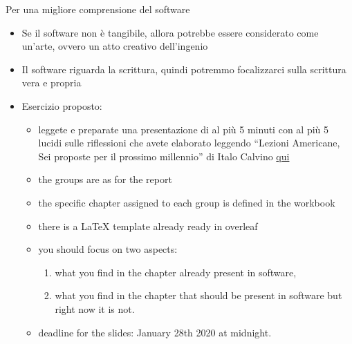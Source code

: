 \documentclass{beamer}
\begin{document}
\begin{frame}{\centerline{Per una migliore comprensione del software}}
\begin{itemize}
\item Se il software non \`{e} tangibile, allora potrebbe essere considerato come un'arte, ovvero un atto creativo dell'ingenio
\item Il software riguarda la scrittura, quindi potremmo focalizzarci sulla scrittura vera e propria 
\item Esercizio proposto: 
\begin{itemize}
\item leggete e preparate una presentazione di al pi\`{u} 5 minuti con al pi\`{u} 5 lucidi sulle riflessioni che avete elaborato leggendo ``Lezioni Americane, Sei proposte per il prossimo millennio'' di Italo Calvino \href{https://github.com/GiancarloSucci/UniBo.IDSEPC.A2022/blob/main/A2022.IDSEPC.ProcessoDiProduzione/ItaloCalvino.LezioniAmericane.pdf}{qui}
\item the groups are as for the report
\item the specific chapter assigned to each group is defined in the workbook
\item there is a LaTeX template already ready in overleaf
\item you should focus on two aspects:
\begin{enumerate}
\item what you find in the chapter already present in software,
\item what you find in the chapter that should be present in software but right now it is not.
\end{enumerate}
\item deadline for the slides: January 28th 2020 at midnight.
\end{itemize}
\end{itemize}

\end{frame}



\end{document}
